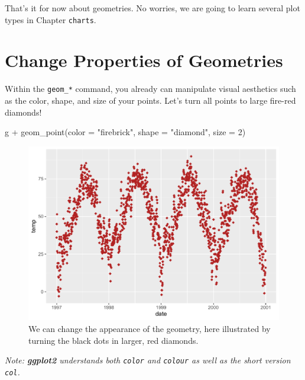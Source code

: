 \documentclass[
]{krantz}
\makeatletter
\newenvironment{Shaded}{\begin{snugshade}}{\end{snugshade}}
\newcommand{\AttributeTok}[1]{\textcolor[rgb]{0.61,0.61,0.61}{#1}}
\newcommand{\DecValTok}[1]{\textcolor[rgb]{0.06,0.06,0.06}{#1}}
\newcommand{\FunctionTok}[1]{\textcolor[rgb]{0,0,0}{#1}}
\newcommand{\NormalTok}[1]{#1}
\newcommand{\SpecialCharTok}[1]{\textcolor[rgb]{0,0,0}{#1}}
\newcommand{\StringTok}[1]{\textcolor[rgb]{0.5,0.5,0.5}{#1}}
\newenvironment{kframe}{%
\medskip{}
\setlength{\fboxsep}{.8em}
 \def\at@end@of@kframe{}%
 \ifinner\ifhmode%
  \def\at@end@of@kframe{\end{minipage}}%
  \begin{minipage}{\columnwidth}%
 \fi\fi%
 \def\FrameCommand##1{\hskip\@totalleftmargin \hskip-\fboxsep
 \colorbox{shadecolor}{##1}\hskip-\fboxsep
     \hskip-\linewidth \hskip-\@totalleftmargin \hskip\columnwidth}%
 \MakeFramed {\advance\hsize-\width
   \@totalleftmargin\z@ \linewidth\hsize
   \@setminipage}}%
 {\par\unskip\endMakeFramed%
 \at@end@of@kframe}
\renewenvironment{Shaded}{\begin{kframe}}{\end{kframe}}
\makeatother
\begin{document}
That's it for now about geometries. No worries, we are going to learn several plot types in Chapter \texttt{charts}.

\hypertarget{prop}{%
\section{Change Properties of Geometries}\label{prop}}

Within the \texttt{geom\_*} command, you already can manipulate visual aesthetics such as the color, shape, and size of your points. Let's turn all points to large fire-red diamonds!

\begin{Shaded}
\begin{Highlighting}[]
\NormalTok{g }\SpecialCharTok{+} \FunctionTok{geom\_point}\NormalTok{(}\AttributeTok{color =} \StringTok{"firebrick"}\NormalTok{, }\AttributeTok{shape =} \StringTok{"diamond"}\NormalTok{, }\AttributeTok{size =} \DecValTok{2}\NormalTok{)}
\end{Highlighting}
\end{Shaded}

\begin{figure}
\centering
\includegraphics{bookdown_files/figure-latex/ggplot-default-col-size-shape-1.pdf}
\caption{\label{fig:ggplot-default-col-size-shape}We can change the appearance of the geometry, here illustrated by turning the black dots in larger, red diamonds.}
\end{figure}

\emph{Note: \textbf{ggplot2} understands both \texttt{color} and \texttt{colour} as well as the short version \texttt{col}.}
\end{document}
